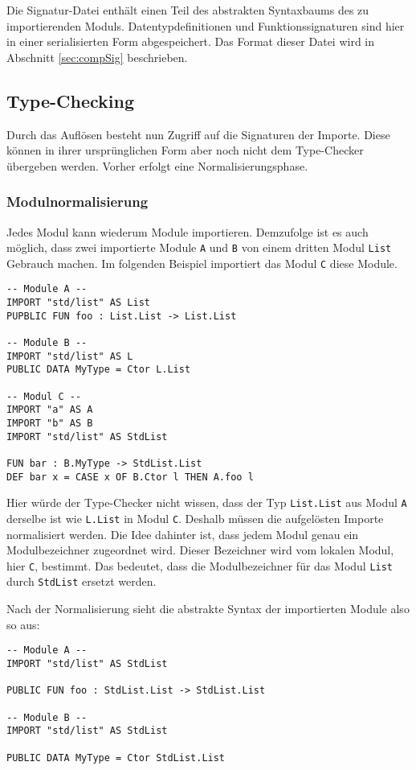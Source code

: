 \documentclass[runningheads]{llncs}
\begin{document}
Die Signatur-Datei enthält einen Teil des abstrakten Syntaxbaums des zu importierenden Moduls. Datentypdefinitionen und Funktionssignaturen sind hier in einer serialisierten Form abgespeichert. Das Format dieser Datei wird in Abschnitt \ref{sec:compSig} beschrieben.

\subsection{Type-Checking}
\label{sec:typeChecking}

Durch das Auflösen besteht nun Zugriff auf die Signaturen der Importe. Diese können in ihrer ursprünglichen Form aber noch nicht dem Type-Checker übergeben werden. Vorher erfolgt eine Normalisierungsphase.

\subsubsection{Modulnormalisierung}

Jedes Modul kann wiederum Module importieren. Demzufolge ist es auch möglich, dass zwei importierte Module \texttt{A} und \texttt{B} von einem dritten Modul \texttt{List} Gebrauch machen. Im folgenden Beispiel importiert das Modul \texttt{C} diese Module.

\begin{verbatim}
-- Module A --
IMPORT "std/list" AS List
PUPBLIC FUN foo : List.List -> List.List

-- Module B --
IMPORT "std/list" AS L
PUBLIC DATA MyType = Ctor L.List

-- Modul C --
IMPORT "a" AS A
IMPORT "b" AS B
IMPORT "std/list" AS StdList

FUN bar : B.MyType -> StdList.List
DEF bar x = CASE x OF B.Ctor l THEN A.foo l
\end{verbatim}

Hier würde der Type-Checker nicht wissen, dass der Typ \verb|List.List| aus Modul \texttt{A} derselbe ist wie \verb|L.List| in Modul \texttt{C}. Deshalb müssen die aufgelösten Importe normalisiert werden. Die Idee dahinter ist, dass jedem Modul genau ein Modulbezeichner zugeordnet wird. Dieser Bezeichner wird vom lokalen Modul, hier \texttt{C}, bestimmt. Das bedeutet, dass die Modulbezeichner für das Modul \texttt{List} durch \verb|StdList| ersetzt werden.

Nach der Normalisierung sieht die abstrakte Syntax der importierten Module also so aus:

\begin{verbatim}
-- Module A --
IMPORT "std/list" AS StdList

PUBLIC FUN foo : StdList.List -> StdList.List

-- Module B --
IMPORT "std/list" AS StdList

PUBLIC DATA MyType = Ctor StdList.List
\end{verbatim}
\end{document}
